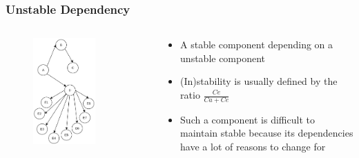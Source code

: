 \documentclass[dvipsnames, 10pt, table]{beamer}
\begin{document}
\begin{frame}
  \frametitle{Unstable Dependency}
  \begin{columns}
    \begin{column}{0.5\textwidth}
      \begin{figure}
        \begin{center}
          \includegraphics[width=0.7\textwidth]{figures/architectural-smells/unstable-dependency.png}
        \end{center}
      \end{figure}
    \end{column}
    \begin{column}{0.5\textwidth}
      \begin{itemize}
        \item A stable component depending on a unstable component
        \item (In)stability is usually defined by the ratio $\frac {Ce} {Ca + Ce}$
        \item Such a component is difficult to maintain stable because its dependencies have a lot of reasons to change for
      \end{itemize}
    \end{column}
  \end{columns}
\end{frame}
\end{document}
